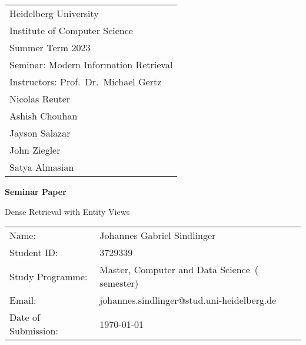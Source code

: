 \documentclass[
     11pt,         %
     a4paper,      %
     oneside,
     ]{article}
\makeatletter
\newcommand{\mytitle}{Dense Retrieval with Entity Views}
\newcommand{\myauthor}{Johannes Gabriel Sindlinger}
\newcommand{\myseminar}{Modern Information Retrieval }
\newcommand{\mysemester}{Summer Term 2023}
\newcommand{\mydozent}{Prof.~Dr.~Michael Gertz}
\newcommand{\mydozentTwo}{Nicolas Reuter}
\newcommand{\mydozentThree}{Ashish Chouhan}
\newcommand{\mydozentFour}{Jayson Salazar}
\newcommand{\mydozentFive}{John Ziegler}
\newcommand{\mydozentSix}{Satya Almasian}
\newcommand{\myMatrikelnummer}{3729339}
\newcommand{\myStudiengang}{Master, Computer and Data Science}
\newcommand{\mySemester}{3}
\newcommand{\myEmail}{johannes.sindlinger@stud.uni-heidelberg.de}
\makeatother
\begin{document}
\begin{titlepage}
\begin{tabular}[l]{l}
Heidelberg University\\
Institute of Computer Science\\
\mysemester\\
Seminar: \myseminar\\
Instructors: \mydozent\\
\phantom{Instructors: }\mydozentTwo\\
\phantom{Instructors: }\mydozentThree\\
  \phantom{Instructors: }\mydozentFour\\
  \phantom{Instructors: }\mydozentFive\\
  \phantom{Instructors: }\mydozentSix
\end{tabular}

\vspace{4cm}
\begin{center}
\textbf{\large Seminar Paper} %
\vspace{0.5\baselineskip}

{\huge
\mytitle
}
\end{center}

\vfill 
\begin{tabular}[l]{ll}
Name:           & \myauthor\\
Student ID: & \myMatrikelnummer\\
Study Programme:    & \myStudiengang\ (\nth{\mySemester} semester)\\
Email: & \myEmail\\
Date of Submission: & \today \\
\end{tabular}

\end{titlepage}

\onehalfspacing
\end{document}

